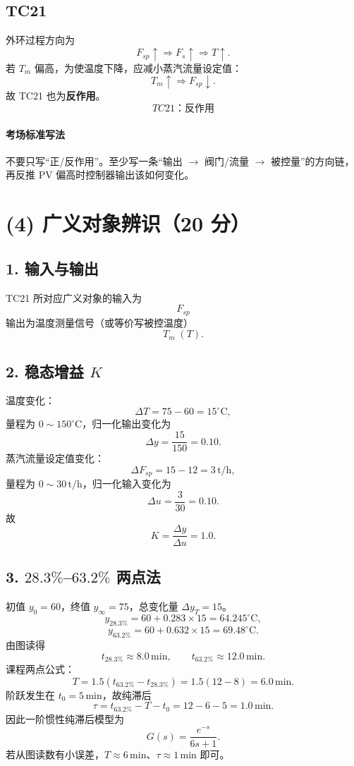 \documentclass[UTF8,a4paper,11pt]{ctexart}
\begin{document}
\subsection*{TC21}
外环过程方向为
\[
F_{sp}\uparrow\Rightarrow F_s\uparrow\Rightarrow T\uparrow.
\]
若 $T_m$ 偏高，为使温度下降，应减小蒸汽流量设定值：
\[
T_m\uparrow\Rightarrow F_{sp}\downarrow.
\]
故 TC21 也为\textbf{反作用}。
\[
\boxed{TC21：反作用}
\]

\paragraph{考场标准写法}
不要只写“正/反作用”。至少写一条“输出 $\rightarrow$ 阀门/流量 $\rightarrow$ 被控量”的方向链，再反推 PV 偏高时控制器输出该如何变化。

\section*{(4) 广义对象辨识（20 分）}
\subsection*{1. 输入与输出}
TC21 所对应广义对象的输入为
\[
\boxed{F_{sp}}
\]
输出为温度测量信号（或等价写被控温度）
\[
\boxed{T_m\;(T)}.
\]

\subsection*{2. 稳态增益 $K$}
温度变化：
\[
\Delta T=75-60=15^{\circ}\mathrm C,
\]
量程为 $0\sim150^{\circ}\mathrm C$，归一化输出变化为
\[
\Delta y=\frac{15}{150}=0.10.
\]
蒸汽流量设定值变化：
\[
\Delta F_{sp}=15-12=3\,\mathrm{t/h},
\]
量程为 $0\sim30\,\mathrm{t/h}$，归一化输入变化为
\[
\Delta u=\frac{3}{30}=0.10.
\]
故
\[
\boxed{K=\frac{\Delta y}{\Delta u}=1.0}.
\]

\subsection*{3. $28.3\%$--$63.2\%$ 两点法}
初值 $y_0=60$，终值 $y_\infty=75$，总变化量 $\Delta y_T=15$。
\[
y_{28.3\%}=60+0.283\times15=64.245^{\circ}\mathrm C,
\]
\[
y_{63.2\%}=60+0.632\times15=69.48^{\circ}\mathrm C.
\]
由图读得
\[
t_{28.3\%}\approx8.0\,\mathrm{min},\qquad
t_{63.2\%}\approx12.0\,\mathrm{min}.
\]
课程两点公式：
\[
T=1.5\left(t_{63.2\%}-t_{28.3\%}\right)
=1.5(12-8)=6.0\,\mathrm{min}.
\]
阶跃发生在 $t_0=5\,\mathrm{min}$，故纯滞后
\[
\tau=t_{63.2\%}-T-t_0=12-6-5=1.0\,\mathrm{min}.
\]
因此一阶惯性纯滞后模型为
\[
\boxed{G(s)=\frac{e^{-s}}{6s+1}}.
\]
若从图读数有小误差，$T\approx6\,\mathrm{min}$、$\tau\approx1\,\mathrm{min}$ 即可。
\end{document}
